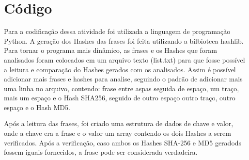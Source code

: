 \chapter{Código} \label{codigo}

Para a codificação dessa atividade foi utilizada a linguagem de programação Python.
A geração dos Hashes das frases foi feita utilizando a bilbioteca hashlib. Para 
tornar o programa mais dinâmico, as frases e os Hashes que foram analisados foram 
colocados em um arquivo texto (list.txt) para que fosse possível a leitura e 
comparação do Hashes gerados com os analisados. Assim é possível adicionar mais 
frases e hashes para analise, seguindo o padrão de adicionar mais uma linha no 
arquivo, contendo: frase entre aspas seguida de espaço, um traço, mais um espaço 
e o Hash SHA256, seguido de outro espaço outro traço, outro espaço e o Hash MD5.

Após a leitura das frases, foi criado uma estrutura de dados de chave e valor, 
onde a chave era a frase e o valor um array contendo os dois Hashes a serem 
verificados. Após a verificação, caso ambos os Hashes SHA-256 e MD5 geradods 
fossem iguais fornecidos, a frase pode ser considerada verdadeira.